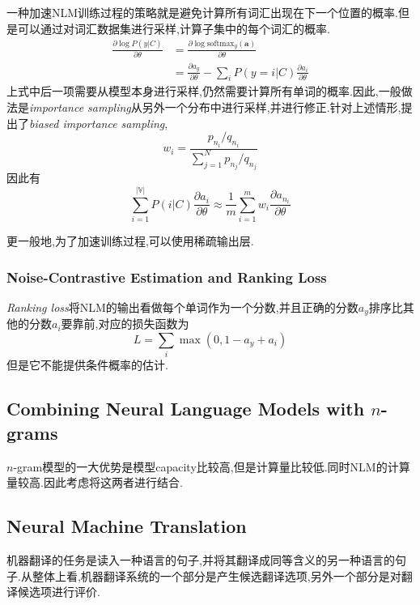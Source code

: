 一种加速NLM训练过程的策略就是避免计算所有词汇出现在下一个位置的概率.但是可以通过对词汇数据集进行采样,计算子集中的每个词汇的概率.
\begin{equation}\begin{split}
\frac{\partial\log P(y|C)}{\partial\theta}&=\frac{\partial\log\text{softmax}_y(\mathbf a)}{\partial\theta}\\
&=\frac{\partial a_y}{\partial\theta}-\sum_{i}P(y=i|C)\frac{\partial a_i}{\partial\theta}
\end{split}\end{equation}
上式中后一项需要从模型本身进行采样,仍然需要计算所有单词的概率.因此,一般做法是\textit{importance sampling}从另外一个分布中进行采样,并进行修正.针对上述情形,提出了\textit{biased importance sampling},
\begin{equation}
w_i=\frac{p_{n_i}/q_{n_i}}{\sum_{j=1}^Np_{n_j}/q_{n_j}}
\end{equation}
因此有
\begin{equation}
\sum_{i=1}^{|\mathbb V|}P(i|C)\frac{\partial a_i}{\partial\theta}\approx\frac{1}{m}\sum_{i=1}^mw_i\frac{\partial a_{n_i}}{\partial\theta}
\end{equation}

更一般地,为了加速训练过程,可以使用稀疏输出层.

\subsubsection{Noise-Contrastive Estimation and Ranking Loss}

\textit{Ranking loss}将NLM的输出看做每个单词作为一个分数,并且正确的分数$a_y$排序比其他的分数$a_i$要靠前,对应的损失函数为
\begin{equation}
L=\sum_i\max(0,1-a_y+a_i)
\end{equation}
但是它不能提供条件概率的估计.

\subsection{Combining Neural Language Models with $n$-grams}

$n$-gram模型的一大优势是模型capacity比较高,但是计算量比较低.同时NLM的计算量较高.因此考虑将这两者进行结合.

\subsection{Neural Machine Translation}

机器翻译的任务是读入一种语言的句子,并将其翻译成同等含义的另一种语言的句子.从整体上看,机器翻译系统的一个部分是产生候选翻译选项,另外一个部分是对翻译候选项进行评价.


